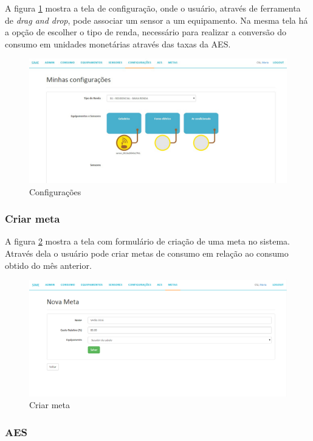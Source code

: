 A figura \ref{fig:telas-config} mostra a tela de configuração, onde o usuário, através de ferramenta de \textit{drag and drop}, pode associar um sensor a um equipamento. Na mesma tela há a opção de escolher o tipo de renda, necessário para realizar a conversão do consumo em unidades monetárias através das taxas da AES.

\begin{figure}[H]
\centering
\includegraphics[width=1\textwidth]{figuras/configuracoes.jpg}
\caption{\label{fig:telas-config} Configurações}
\end{figure}

\subsubsection{Criar meta}

A figura \ref{fig:telas-metas-create} mostra a tela com formulário de criação de uma meta no sistema. Através dela o usuário pode criar metas de consumo em relação ao consumo obtido do mês anterior.

\begin{figure}[H]
\centering
\includegraphics[width=1\textwidth]{figuras/meta.jpg}
\caption{\label{fig:telas-metas-create} Criar meta}
\end{figure}

\subsubsection{AES}

